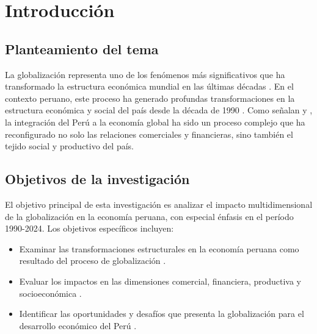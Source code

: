 \documentclass[12pt, a4paper]{article}
\begin{document}

\tableofcontents
\newpage

\section{Introducción}

\subsection{Planteamiento del tema}
La globalización representa uno de los fenómenos más significativos que ha transformado la estructura económica mundial en las últimas décadas \parencite{stiglitz2002}. En el contexto peruano, este proceso ha generado profundas transformaciones en la estructura económica y social del país desde la década de 1990 \parencite{dancourt2016}. Como señalan \cite{contreras2018} y \cite{parodi2015}, la integración del Perú a la economía global ha sido un proceso complejo que ha reconfigurado no solo las relaciones comerciales y financieras, sino también el tejido social y productivo del país.

\subsection{Objetivos de la investigación}
El objetivo principal de esta investigación es analizar el impacto multidimensional de la globalización en la economía peruana, con especial énfasis en el período 1990-2024. Los objetivos específicos incluyen:

\begin{itemize}
    \item Examinar las transformaciones estructurales en la economía peruana como resultado del proceso de globalización \parencite{jimenez2017}.
    \item Evaluar los impactos en las dimensiones comercial, financiera, productiva y socioeconómica \parencite{yamada2019}.
    \item Identificar las oportunidades y desafíos que presenta la globalización para el desarrollo económico del Perú \parencite{garcia2019}.
\end{itemize}
\end{document}
